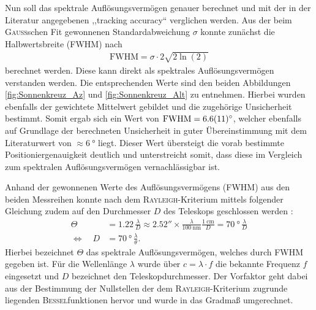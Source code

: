    Nun soll das spektrale Auflösungsvermögen genauer berechnet und mit der in der Literatur angegebenen ,,tracking accuracy`` verglichen werden.
    Aus der beim \textsc{Gauß}schen Fit gewonnenen Standardabweichung $\sigma$ konnte zunächst die Halbwertsbreite (FWHM) nach \cite{wiki:FWHM}
    \begin{align}
        \text{FWHM} = \sigma \cdot 2\sqrt{2\ln(2)} \label{eq:FWHM}
    \end{align}
    berechnet werden.
    Diese kann direkt als spektrales Auflösungsvermögen verstanden werden.
    Die entsprechenden Werte sind den beiden Abbildungen \ref{fig:Sonnenkreuz_Az} und \ref{fig:Sonnenkreuz_Alt} zu entnehmen. Hierbei wurden ebenfalls der gewichtete Mittelwert gebildet und die zugehörige Unsicherheit bestimmt.
    Somit ergab sich ein Wert von $\text{FWHM} = \SI{6.6 \pm 1.1}{\degree}$, welcher ebenfalls auf Grundlage der berechneten Unsicherheit in guter Übereinstimmung mit dem Literaturwert von $\approx \SI{6}{\degree}$ \cite{Usermanual} liegt. 
    Dieser Wert übersteigt die vorab bestimmte Positioniergenauigkeit deutlich und unterstreicht somit, dass diese im Vergleich zum spektralen Auflösungsvermögen vernachlässigbar ist.

    Anhand der gewonnenen Werte des Auflösungsvermögens (FWHM) aus den beiden Messreihen konnte nach dem \textsc{Rayleigh}-Kriterium mittels folgender Gleichung zudem auf den Durchmesser $D$ des Teleskops geschlossen werden \cite{Karttunen2013}:
    \begin{align}
        \Theta &= 1.22 \, \frac{\lambda}{D} \approx \ang{;;2.52} \times \frac{\lambda}{\SI{100}{\nano \metre}} \frac{\SI{1}{\centi \metre}}{D} = \SI{70}{\degree} \, \frac{\lambda}{D}\\
        \Leftrightarrow \quad D &= \SI{70}{\degree} \, \frac{\lambda}{\theta}.
    \end{align}
    Hierbei bezeichnet $\Theta$ das spektrale Auflösungsvermögen, welches durch FWHM gegeben ist. Für die Wellenlänge $\lambda$ wurde über $c = \lambda \cdot f$ die bekannte Frequenz $f$ eingesetzt und $D$ bezeichnet den Teleskopdurchmesser.
    Der Vorfaktor geht dabei aus der Bestimmung der Nullstellen der dem \textsc{Rayleigh}-Kriterium zugrunde liegenden \textsc{Bessel}funktionen hervor und wurde in das Gradmaß umgerechnet.

